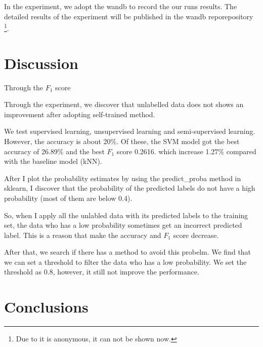 \documentclass[11pt]{article}
\begin{document}
In the experiment, we adopt the wandb to record the our runs results.
The detailed results of the experiment will be published in the wandb reporepository \footnote{Due to it is anonymous, it can not be shown now.}.




\section{Discussion}

Through the $F_1$ score 

Through the experiment, we discover that unlabelled data does not shows an improvement after adopting self-trained method.


We test supervised learning, unsupervised learning and semi-supervised learning. 
However, the accuracy is about 20\%.
Of these, the SVM model got the best accuracy of 26.89\% and the best $F_1$ score 0.2616.
which increase 1.27\% compared with the baseline model (kNN).


After I plot the probability estimates by using the predict\_proba method in sklearn,
I discover that the probability of the predicted labels do not have a high probability (most of them are below 0.4).

So, when I apply all the unlabled data with its predicted labels to the training set,
the data who has a low probability sometimes get an incorrect predicted label. 
This is a reason that make the accuracy and $F_1$ score decrease.

After that, we search if there has a method to avoid this probelm.
We find that we can set a threshold to filter the data who has a low probability. \cite{Self-trained-semi-supervised-learning}
We set the threshold as 0.8, however, it still not improve the performance.







\section{Conclusions}









\nocite{*}


\end{document}
